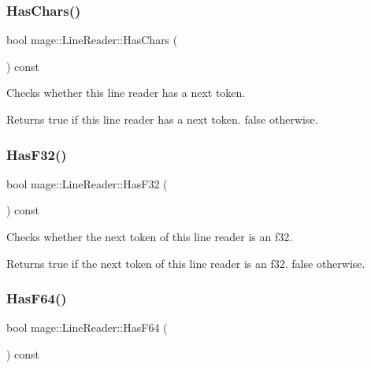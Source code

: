 \subsubsection{\texorpdfstring{Has\+Chars()}{HasChars()}}
{\footnotesize\ttfamily bool mage\+::\+Line\+Reader\+::\+Has\+Chars (\begin{DoxyParamCaption}{ }\end{DoxyParamCaption}) const\hspace{0.3cm}{\ttfamily [protected]}}

Checks whether this line reader has a next token.

\begin{DoxyReturn}{Returns}
{\ttfamily true} if this line reader has a next token. {\ttfamily false} otherwise. 
\end{DoxyReturn}
\hypertarget{classmage_1_1_line_reader_a2b2b2719576045b6531a2b8b31c61cee}{}\label{classmage_1_1_line_reader_a2b2b2719576045b6531a2b8b31c61cee} 
\subsubsection{\texorpdfstring{Has\+F32()}{HasF32()}}
{\footnotesize\ttfamily bool mage\+::\+Line\+Reader\+::\+Has\+F32 (\begin{DoxyParamCaption}{ }\end{DoxyParamCaption}) const\hspace{0.3cm}{\ttfamily [protected]}}

Checks whether the next token of this line reader is an {\ttfamily f32}.

\begin{DoxyReturn}{Returns}
{\ttfamily true} if the next token of this line reader is an {\ttfamily f32}. {\ttfamily false} otherwise. 
\end{DoxyReturn}
\hypertarget{classmage_1_1_line_reader_a65f4edadd232fdd19c7ba9d044c7d2aa}{}\label{classmage_1_1_line_reader_a65f4edadd232fdd19c7ba9d044c7d2aa} 
\subsubsection{\texorpdfstring{Has\+F64()}{HasF64()}}
{\footnotesize\ttfamily bool mage\+::\+Line\+Reader\+::\+Has\+F64 (\begin{DoxyParamCaption}{ }\end{DoxyParamCaption}) const\hspace{0.3cm}{\ttfamily [protected]}}

